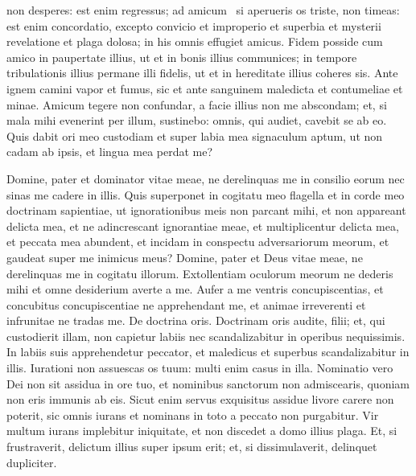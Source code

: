\begin{biblechapter}
\begin{biblechapter}
\begin{biblechapter}
\begin{biblechapter}
\begin{biblechapter}
\begin{biblechapter}
\begin{biblechapter}
\begin{biblechapter}
\begin{biblechapter}
\begin{biblechapter}
\begin{biblechapter}
\begin{biblechapter}
\begin{biblechapter}
\begin{biblechapter}
\begin{biblechapter}
\begin{biblechapter}
\begin{biblechapter}
\begin{biblechapter}
\begin{biblechapter}
\begin{biblechapter}
\begin{biblechapter}
\begin{biblechapter}
 non desperes: est enim regressus;
 ad amicum 
 \verse si aperueris os triste,
 non timeas: est enim concordatio,
 excepto convicio et improperio et superbia
 et mysterii revelatione et plaga dolosa;
 in his omnis effugiet amicus.
 \verse Fidem posside cum amico in paupertate illius,
 ut et in bonis illius communices;
 \verse in tempore tribulationis illius permane illi fidelis,
 ut et in hereditate illius coheres sis.
 \verse Ante ignem camini vapor et fumus,
 sic et ante sanguinem maledicta et contumeliae et minae.
 \verse Amicum tegere non confundar,
 a facie illius non me abscondam;
 et, si mala mihi evenerint per illum, sustinebo:
 \verse omnis, qui audiet, cavebit se ab eo.
 \verse Quis dabit ori meo custodiam
 et super labia mea signaculum aptum,
 ut non cadam ab ipsis, et lingua mea perdat me?
 
\begin{biblechapter}
\verse Domine, pater et dominator vitae meae,
 ne derelinquas me in consilio eorum
 nec sinas me cadere in illis.
 \verse Quis superponet in cogitatu meo flagella
 et in corde meo doctrinam sapientiae,
 ut ignorationibus meis non parcant mihi,
 et non appareant delicta mea,
 \verse et ne adincrescant ignorantiae meae,
 et multiplicentur delicta mea, et peccata mea abundent,
 et incidam in conspectu adversariorum meorum,
 et gaudeat super me inimicus meus?
 \verse Domine, pater et Deus vitae meae,
 ne derelinquas me in cogitatu illorum.
 \verse Extollentiam oculorum meorum ne dederis mihi
 et omne desiderium averte a me.
 \verse Aufer a me ventris concupiscentias,
 et concubitus concupiscentiae ne apprehendant me,
 et animae irreverenti et infrunitae ne tradas me.
 \verse De doctrina oris.
 Doctrinam oris audite, filii;
 et, qui custodierit illam, non capietur labiis
 nec scandalizabitur in operibus nequissimis.
 \verse In labiis suis apprehendetur peccator,
 et maledicus et superbus scandalizabitur in illis.
 \verse Iurationi non assuescas os tuum:
 multi enim casus in illa.
 \verse Nominatio vero Dei non sit assidua in ore tuo,
 et nominibus sanctorum non admiscearis,
 quoniam non eris immunis ab eis.
 \verse Sicut enim servus exquisitus assidue
 livore carere non poterit,
 sic omnis iurans et nominans in toto
 a peccato non purgabitur.
 \verse Vir multum iurans implebitur iniquitate,
 et non discedet a domo illius plaga.
 \verse Et, si frustraverit, delictum illius super ipsum erit;
 et, si dissimulaverit, delinquet dupliciter.

\end{biblechapter}
\end{biblechapter}
\end{biblechapter}
\end{biblechapter}
\end{biblechapter}
\end{biblechapter}
\end{biblechapter}
\end{biblechapter}
\end{biblechapter}
\end{biblechapter}
\end{biblechapter}
\end{biblechapter}
\end{biblechapter}
\end{biblechapter}
\end{biblechapter}
\end{biblechapter}
\end{biblechapter}
\end{biblechapter}
\end{biblechapter}
\end{biblechapter}
\end{biblechapter}
\end{biblechapter}
\end{biblechapter}
